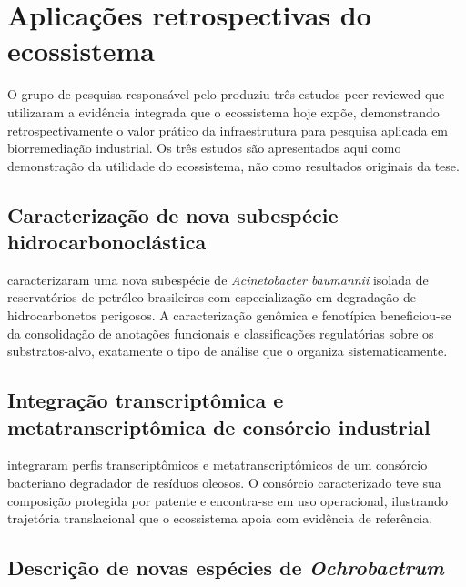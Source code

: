 \section{Aplicações retrospectivas do ecossistema}
\label{sec:c7-aplicacoes}

O grupo de pesquisa responsável pelo \biorempp{} produziu três estudos peer-reviewed que utilizaram a evidência integrada que o ecossistema hoje expõe, demonstrando retrospectivamente o valor prático da infraestrutura para pesquisa aplicada em biorremediação industrial. Os três estudos são apresentados aqui como demonstração da utilidade do ecossistema, não como resultados originais da tese.

\subsection{Caracterização de nova subespécie hidrocarbonoclástica}

\citet{freitas2023acinetobacter} caracterizaram uma nova subespécie de \textit{Acinetobacter baumannii} isolada de reservatórios de petróleo brasileiros com especialização em degradação de hidrocarbonetos perigosos. A caracterização genômica e fenotípica beneficiou-se da consolidação de anotações funcionais e classificações regulatórias sobre os substratos-alvo, exatamente o tipo de análise que o \biorempp{} organiza sistematicamente.

\subsection{Integração transcriptômica e metatranscriptômica de consórcio industrial}

\citet{silvaportela2024consortium} integraram perfis transcriptômicos e metatranscriptômicos de um consórcio bacteriano degradador de resíduos oleosos. O consórcio caracterizado teve sua composição protegida por patente e encontra-se em uso operacional, ilustrando trajetória translacional que o ecossistema \biorempp{} apoia com evidência de referência.


\subsection{Descrição de novas espécies de \textit{Ochrobactrum}}

